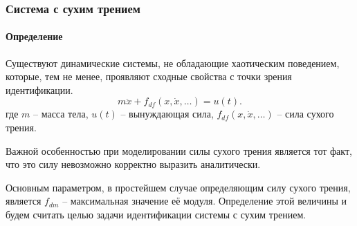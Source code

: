 \documentclass[10pt,utf8]{beamer}
\begin{document}


\begin{frame}
  \frametitle{Система с сухим трением}
  \framesubtitle{Определение}

  Существуют динамические системы, не обладающие хаотическим поведением,
  которые, тем не менее, проявляют сходные свойства с точки зрения идентификации.
  \begin{equation}
    m \ddot{x} + f_{df}( x, \dot{x}, \ldots)  = u(t).
    \label{atu:eq:dryfric_sys}
  \end{equation}
  где
  $m$ -- масса тела,
  $u(t)$ -- вынуждающая сила,
  $ f_{df}( x, \dot{x}, \ldots)  $ -- сила сухого трения.

  Важной особенностью при моделировании силы сухого трения является тот факт,
  что это силу невозможно корректно выразить аналитически.

  Основным параметром, в простейшем случае определяющим силу сухого
  трения, является $f_{dm}$ -- максимальная значение её модуля.
  Определение этой величины и будем считать целью задачи идентификации
  системы с сухим трением.

\end{frame}


\end{document}
